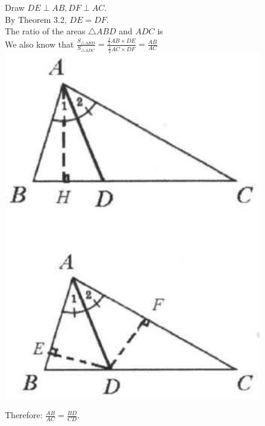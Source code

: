 \documentclass{article}
\begin{document}
Draw \(D E \perp A B, D F \perp A C\).\\
By Theorem 3.2, \(D E=D F\).\\
The ratio of the areas \(\triangle A B D\) and \(A D C\) is\\
We also know that \(\frac{S_{\triangle A B D}}{S_{\triangle A D C}}=\frac{\frac{1}{2} A B \times D E}{\frac{1}{2} A C \times D F}=\frac{A B}{A C}\)\\
\centering
\includegraphics[width=\textwidth]{images/reasoning_image_1.jpg}


Therefore: \(\frac{A B}{A C}=\frac{B D}{C D}\).
\end{document}
